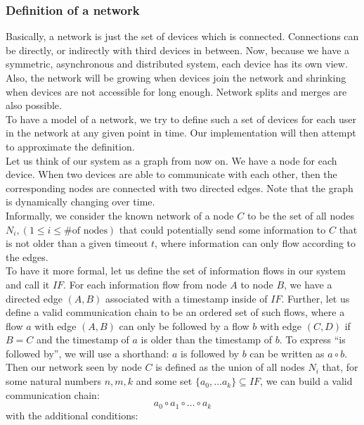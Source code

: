 	\subsubsection{Definition of a network}
	Basically, a network is just the set of devices which is connected. Connections can be directly, or indirectly with third devices in between. Now, because we have a symmetric, asynchronous and distributed system, each device has its own view. Also, the network will be growing when devices join the network and shrinking when devices are not accessible for long enough. Network splits and merges are also possible. \\
	To have a model of a network, we try to define such a set of devices for each user in the network at any given point in time. Our implementation will then attempt to approximate the definition. \\
	Let us think of our system as a graph from now on. We have a node for each device. When two devices are able to communicate with each other, then the corresponding nodes are connected with two directed edges. Note that the graph is dynamically changing over time.\\
	Informally, we consider the known network of a node $C$ to be the set of all nodes $N_i, (1 \leq i \leq \text{\# of nodes})$ that could potentially send some information to $C$ that is not older than a given timeout $t$, where information can only flow according to the edges. \\
	To have it more formal, let us define the set of information flows in our system and call it $IF$. For each information flow from node $A$ to node $B$, we have a directed edge $(A,B)$ associated with a timestamp inside of $IF$. Further, let us define a valid communication chain to be an ordered set of such flows, where a flow $a$ with edge $(A,B)$ can only be followed by a flow $b$ with edge $(C,D)$ if  $B = C$ and the timestamp of $a$ is older than the timestamp of $b$. To express ``is followed by'', we will use a shorthand: $a$ is followed by $b$ can be written as $a\circ b$.\\
	Then our network seen by node $C$ is defined as the union of all nodes $N_i$ that, for some natural numbers $n, m, k$ and some set $\{a_0,\ldots a_k\} \subseteq IF$, we can build a valid communication chain:\\
	\begin{displaymath}
		a_0 \circ a_1 \circ \ldots \circ a_k
	\end{displaymath}
	with the additional conditions: \\
